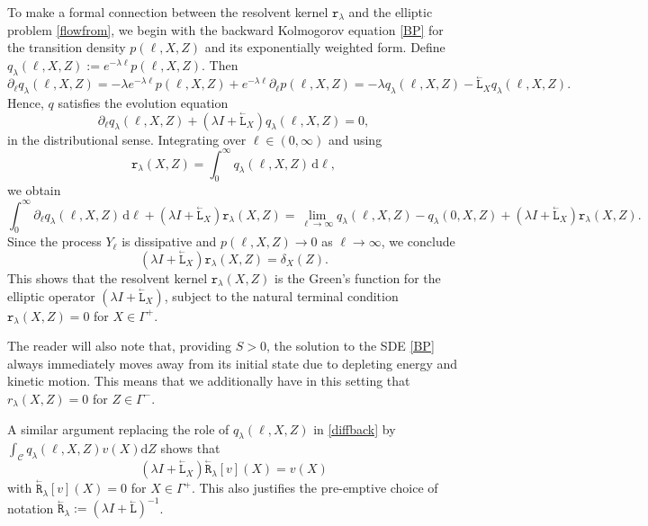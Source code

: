 \documentclass{amsart}
\newcommand{\dd}{{\mathrm d}}
\newcommand{\bL}{\stackrel{_\leftarrow}{\mathtt L}}
\newcommand{\bR}{\stackrel{_\leftarrow}{\mathtt R}}
\newcommand{\rr}{{\mathtt r}}
\theoremstyle{plain}
\begin{document}
To make a formal connection between the resolvent kernel
$\rr_\lambda$ and the elliptic problem \eqref{flowfrom}, we begin
with the backward Kolmogorov equation \eqref{BP} for the transition
density $p(\ell, X, Z)$ and its exponentially weighted form. Define
$q_\lambda(\ell, X, Z) := e^{-\lambda \ell} p(\ell, X, Z)$. Then
\begin{equation}
  \partial_\ell q_\lambda(\ell, X, Z)
  = -\lambda e^{-\lambda \ell} p(\ell, X, Z) + e^{-\lambda \ell} \partial_\ell p(\ell, X, Z)
  = -\lambda q_\lambda(\ell, X, Z) - \bL_X q_\lambda(\ell, X, Z).
  \label{diffback}
\end{equation}
Hence, $q$ satisfies the evolution equation
\begin{equation}
  \partial_\ell q_\lambda(\ell, X, Z) + (\lambda I + \bL_X) q_\lambda(\ell, X, Z) = 0,
\end{equation}
in the distributional sense. Integrating over $\ell \in (0, \infty)$ and using
\begin{equation}
  \rr_\lambda(X, Z) = \int_0^\infty q_\lambda(\ell, X, Z) \, \dd \ell,
\end{equation}
we obtain
\begin{equation}
  \int_0^\infty \partial_\ell q_\lambda(\ell, X, Z) \, \dd \ell
  + (\lambda I + \bL_X) \rr_\lambda(X, Z)
  = \lim_{\ell \to \infty} q_\lambda(\ell, X, Z) - q_\lambda(0, X, Z) + (\lambda I + \bL_X) \rr_\lambda(X, Z).
\end{equation}
Since the process $Y_\ell$ is dissipative and $p(\ell, X, Z) \to 0$ as
$\ell \to \infty$, we conclude
\begin{equation}
  (\lambda I + \bL_X) \rr_\lambda(X, Z) = \delta_X(Z).
  \label{firstdelta}
\end{equation}
This shows that the resolvent kernel $\rr_\lambda(X, Z)$ is the
Green's function for the elliptic operator $(\lambda I + \bL_X)$,
subject to the natural terminal condition $\rr_\lambda(X, Z) = 0$ for
$X \in \Gamma^+$.

The reader will also note that, providing $S>0$, the solution to the
SDE \eqref{BP} always immediately moves away from its initial state
due to depleting energy and kinetic motion. This means that we
additionally have in this setting that $r_\lambda(X,Z) = 0$ for $Z\in
\Gamma^-$.

A similar argument replacing the role of $q_\lambda(\ell, X, Z)$ in
\eqref{diffback} by $\int_\mathcal{C}q_\lambda(\ell, X, Z)v(X)\dd Z$
shows that
\begin{equation}
  (\lambda I + \bL_X)  \bR_\lambda[v](X)= v(X)
  \label{integratedfirstdelta}
\end{equation}
with $ \bR_\lambda[v](X) = 0$ for $X\in\Gamma^+$.  This also justifies
the pre-emptive choice of notation $\bR_\lambda := (\lambda I +
\bL)^{-1}$.
\end{document}
